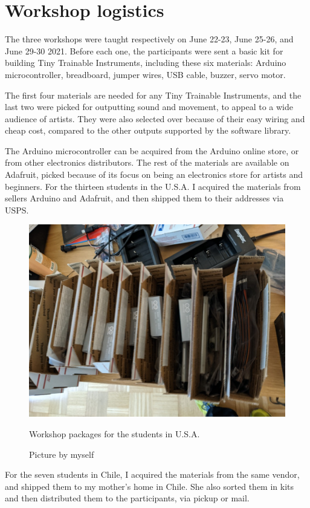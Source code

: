 \section{Workshop logistics}

The three workshops were taught respectively on June 22-23, June 25-26, and June 29-30 2021. Before each one, the participants were sent a basic kit for building Tiny Trainable Instruments, including these six materials: Arduino microcontroller, breadboard, jumper wires, USB cable, buzzer, servo motor.

The first four materials are needed for any Tiny Trainable Instruments, and the last two were picked for outputting sound and movement, to appeal to a wide audience of artists. They were also selected over because of their easy wiring and cheap cost, compared to the other outputs supported by the software library.

The Arduino microcontroller can be acquired from the Arduino online store, or from other electronics distributors. The rest of the materials are available on Adafruit, picked because of its focus on being an electronics store for artists and beginners. For the thirteen students in the U.S.A. I acquired the materials from sellers Arduino and Adafruit, and then shipped them to their addresses via \acrfull{USPS}.

\begin{figure}[ht]
  \centering
  \includegraphics[width=0.75\linewidth,height=0.25\textheight,keepaspectratio]{images/workshop-packages.jpg}
  \caption{Workshop packages for the students in U.S.A.}
  \caption*{Picture by myself}
  \label{fig:workshop-packages-usa}
\end{figure}

For the seven students in Chile, I acquired the materials from the same vendor, and shipped them to my mother's home in Chile. She also sorted them in kits and then distributed them to the participants, via pickup or mail.

